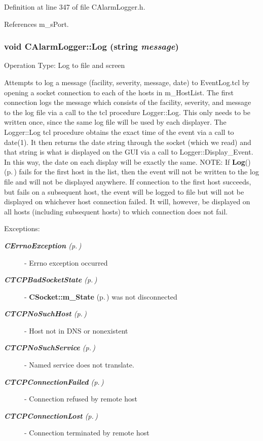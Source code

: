Definition at line 347 of file CAlarm\-Logger.h.

References m\_\-s\-Port.
\subsubsection{\setlength{\rightskip}{0pt plus 5cm}void CAlarm\-Logger::Log (string {\em message})}\label{classCAlarmLogger_a7}


Operation Type: Log to file and screen

Attempts to log a message (facility, severity, message, date) to  Event\-Log.tcl by opening a socket connection to each of the hosts in m\_\-Host\-List. The first connection logs the message which consists of the facility, severity, and message to the log file via a call to the tcl procedure Logger::Log. This only needs to be written once, since the same log file will be used by each displayer. The Logger::Log tcl procedure obtains the exact time of the event via a call to date(1). It then returns the date string through the socket (which we read) and that string is what is displayed on the GUI via a call to Logger::Display\_\-Event. In this way, the date on each display will be exactly the same. NOTE: If {\bf Log}() {\rm (p.\,\pageref{classCAlarmLogger_a7})} fails for the first host in the list, then the event will not be written to the log file and will not be displayed anywhere.  If connection to the first host succeeds, but fails on a subsequent host, the event will be logged to file but will not be displayed on whichever host connection failed. It will, however, be displayed on all hosts (including subsequent hosts) to which connection does not fail.\begin{Desc}
\item[Exceptions: ]\par
\begin{description}
\item[{\em 
{\bf CErrno\-Exception} {\rm (p.\,\pageref{classCErrnoException})}}] - Errno exception occurred \item[{\em 
{\bf CTCPBad\-Socket\-State} {\rm (p.\,\pageref{classCTCPBadSocketState})}}] - {\bf CSocket::m\_\-State} {\rm (p.\,\pageref{classCSocket_o1})} was not disconnected \item[{\em 
{\bf CTCPNo\-Such\-Host} {\rm (p.\,\pageref{classCTCPNoSuchHost})}}] - Host not in DNS or nonexistent \item[{\em 
{\bf CTCPNo\-Such\-Service} {\rm (p.\,\pageref{classCTCPNoSuchService})}}] - Named service does not translate. \item[{\em 
{\bf CTCPConnection\-Failed} {\rm (p.\,\pageref{classCTCPConnectionFailed})}}] - Connection refused by remote host \item[{\em 
{\bf CTCPConnection\-Lost} {\rm (p.\,\pageref{classCTCPConnectionLost})}}] - Connection terminated by remote host\end{description}
\end{Desc}
